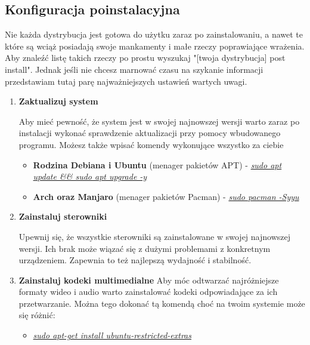 \documentclass[10pt,a4paper]{report}
\begin{document}
\subsection{Konfiguracja poinstalacyjna}	

Nie każda dystrybucja jest gotowa do użytku zaraz po zainstalowaniu, a nawet te które są wciąż posiadają swoje mankamenty i małe rzeczy poprawiające wrażenia. Aby znaleźć listę takich rzeczy po prostu wyszukaj "[twoja dystrybucja] post install". Jednak jeśli nie chcesz marnować czasu na szykanie informacji przedstawiam tutaj parę najważniejszych ustawień wartych uwagi.

\begin{enumerate}

\item \textbf{Zaktualizuj system} \par Aby mieć pewność, że system jest w swojej najnowszej wersji warto zaraz po instalacji wykonać sprawdzenie aktualizacji przy pomocy wbudowanego programu. Możesz także wpisać komendy wykonujące wszystko za ciebie
\begin{itemize}
\item \textbf{Rodzina Debiana i Ubuntu} (menager pakietów APT) - \textsl{\underline{sudo apt update \&\& sudo apt upgrade -y}}
\item \textbf{Arch oraz Manjaro} (menager pakietów Pacman) - \textsl{\underline{sudo pacman -Syyu}}\\
\end{itemize}

\item \textbf{Zainstaluj sterowniki}\par Upewnij się, że wszystkie sterowniki są zainstalowane w swojej najnowszej wersji. Ich brak może wiązać się z dużymi problemami z konkretnym urządzeniem. Zapewnia to też najlepszą wydajność i stabilność.\\

\item \textbf{Zainstaluj kodeki multimedialne} Aby móc odtwarzać najróżniejsze formaty wideo i audio warto zainstalować kodeki odpowiadające za ich przetwarzanie. Można tego dokonać tą komendą choć na twoim systemie może się różnić:
\begin{itemize}
\item \textsl{\underline{sudo apt-get install ubuntu-restricted-extras}}\\
\end{itemize}


\end{enumerate}
\end{document}
